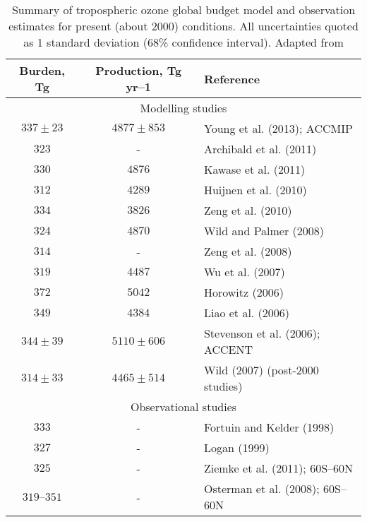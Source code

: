 \documentclass[11pt,a4paper]{article}
\begin{document}
\begin{table}[h] %
\centering
\caption{Summary of tropospheric ozone global budget model and observation estimates for present (about 2000) conditions. All uncertainties quoted as 1 standard deviation (68\% confidence interval). Adapted from \citep{Myhre2013}}
\label{tab:O3budget}
\begin{tabular}{ccl}
\hline
Burden, Tg & Production, Tg yr–1 & Reference \\
\hline
\multicolumn{3}{c}{Modelling studies} \\
$337\pm23$  & $4877\pm853$ & Young et al. (2013); ACCMIP \\
$323$	    & -	           & Archibald et al. (2011) \\
$330$	    & $4876$       & Kawase et al. (2011) \\
$312$       & $4289$       & Huijnen et al. (2010) \\
$334$       & $3826$       & Zeng et al. (2010) \\
$324$       & $4870$       & Wild and Palmer (2008) \\
$314$       & -	           & Zeng et al. (2008) \\
$319$	    & $4487$	   & Wu et al. (2007) \\
$372$	    & $5042$       & Horowitz (2006) \\
$349$	    & $4384$	   & Liao et al. (2006) \\
$344\pm39$	& $5110\pm606$ & Stevenson et al. (2006); ACCENT \\
$314\pm33$	& $4465\pm514$ & Wild (2007) (post-2000 studies) \\
\hline
\multicolumn{3}{c}{Observational studies} \\
$333$   	& -	           & Fortuin and Kelder (1998) \\
$327$	    & -	           & Logan (1999) \\
$325$	    & -	           & Ziemke et al. (2011); 60S–60N \\
$319–351$	& -	           & Osterman et al. (2008); 60S–60N \\
\hline
\end{tabular}
\end{table}
\end{document}
